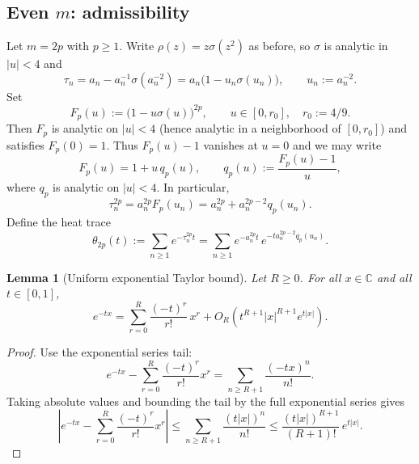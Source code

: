 \documentclass[11pt,letterpaper]{amsart}
\numberwithin{equation}{section}
\newtheorem{lemma}[theorem]{Lemma}
\theoremstyle{definition}
\newcommand{\C}{\mathbb{C}}
\begin{document}
\subsection{Even $m$: admissibility}

Let $m=2p$ with $p\ge1$.
Write $\rho(z)=z\sigma(z^2)$ as before, so $\sigma$ is analytic in $|u|<4$ and
\[
\tau_n=a_n-a_n^{-1}\sigma(a_n^{-2})=a_n\bigl(1-u_n\sigma(u_n)\bigr),\qquad u_n:=a_n^{-2}.
\]
Set
\[
F_p(u):=\bigl(1-u\sigma(u)\bigr)^{2p},\qquad u\in[0,r_0],\quad r_0:=4/9.
\]
Then $F_p$ is analytic on $|u|<4$ (hence analytic in a neighborhood of $[0,r_0]$) and satisfies
$F_p(0)=1$.  Thus $F_p(u)-1$ vanishes at $u=0$ and we may write
\[
F_p(u)=1+u\,q_p(u),
\qquad
q_p(u):=\frac{F_p(u)-1}{u},
\]
where $q_p$ is analytic on $|u|<4$. In particular,
\begin{equation}\label{eq:even-normal-form-correct}
\tau_n^{2p}=a_n^{2p}F_p(u_n)=a_n^{2p}+a_n^{2p-2}q_p(u_n).
\end{equation}
Define the heat trace
\[
\theta_{2p}(t):=\sum_{n\ge1}e^{-\tau_n^{2p}t}
=\sum_{n\ge1}e^{-a_n^{2p}t}\,e^{-t a_n^{2p-2}q_p(u_n)}.
\]

\begin{lemma}[Uniform exponential Taylor bound]\label{lem:exp-taylor-bound}
Let $R\ge0$.  For all $x\in\C$ and all $t\in[0,1]$,
\[
e^{-tx}=\sum_{r=0}^{R}\frac{(-t)^r}{r!}\,x^r
+O_R\!\left(t^{R+1}|x|^{R+1}e^{t|x|}\right).
\]
\end{lemma}

\begin{proof}
Use the exponential series tail:
\[
e^{-tx}-\sum_{r=0}^{R}\frac{(-t)^r}{r!}x^r
=\sum_{n\ge R+1}\frac{(-t x)^n}{n!}.
\]
Taking absolute values and bounding the tail by the full exponential series gives
\[
\left|e^{-tx}-\sum_{r=0}^{R}\frac{(-t)^r}{r!}x^r\right|
\le \sum_{n\ge R+1}\frac{(t|x|)^n}{n!}
\le \frac{(t|x|)^{R+1}}{(R+1)!}\,e^{t|x|}.
\]
\end{proof}
\end{document}
